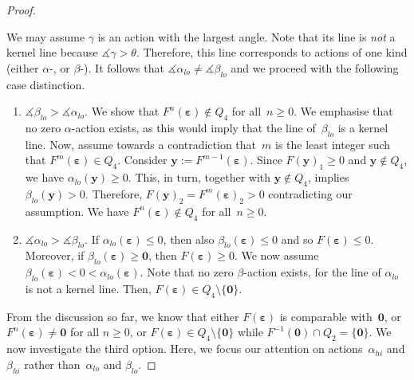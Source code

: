 \documentclass[preprint,12pt]{elsarticle}
\theoremstyle{plain}
\theoremstyle{definition}
\theoremstyle{remark}
\theoremstyle{claimstyle}
\newcommand{\eps}{\bm{\varepsilon}}
\begin{document}
\begin{proof}
\begin{enumerate}
			We may assume $\gamma$ is an action with the largest angle. 
			Note that its line is \emph{not} a kernel line because $\measuredangle\gamma > \theta$.
			Therefore, this line corresponds to actions of one kind (either $\alpha$-, or $\beta$-). 
			It follows that $\measuredangle\alpha_{lo} \neq \measuredangle\beta_{lo}$ and we proceed with the following case distinction.
			\begin{enumerate}
				\item $\measuredangle \beta_{lo} > \measuredangle \alpha_{lo}$. 
				We show that $F^n(\eps) \not\in Q_4$ for all~$n \geq 0$. 
				We emphasise that no zero $\alpha$-action exists, as this would imply that the line of~$\beta_{lo}$ is a kernel line.
				Now, assume towards a contradiction that~$m$ is the least integer such that $F^m(\eps) \in Q_4$.
				Consider $\bm{y}:= F^{m-1}(\eps)$.
				Since $F(\bm{y})_1 \geq 0$ and $\bm{y} \not\in Q_4$, we have $\alpha_{lo}(\bm{y}) \geq 0$.
				This, in turn, together with $\bm{y} \not\in Q_4$, implies $\beta_{lo}(\bm{y}) > 0$. Therefore, $F(\bm{y})_2 = F^m(\eps)_2 > 0$ contradicting our assumption.
				We have $F^n(\eps) \not\in Q_4$ for all~$n \geq 0$.
				
				\item $\measuredangle \alpha_{lo} > \measuredangle \beta_{lo}$.
				If $\alpha_{lo}(\eps) \leq 0$, then also $\beta_{lo}(\eps) \leq 0$ and so $F(\eps) \leq 0$.
				Moreover, if $\beta_{lo}(\eps) \geq \bm{0}$, then $F(\eps) \geq 0$.
				We now assume $\beta_{lo}(\eps) < 0 < \alpha_{lo}(\eps)$.
				Note that no zero $\beta$-action exists, for the line of $\alpha_{lo}$ is not a kernel line.  %
				Then, $F(\eps) \in Q_4 \setminus \{\bm{0}\}$.
			\end{enumerate}
		\end{enumerate}
		
		From the discussion so far, we know that either $F(\eps)$ is comparable with~$\bm{0}$, 
		or $F^n(\eps) \neq \bm{0}$ for all $n \geq 0$,
		or $F(\eps) \in Q_4\setminus \{\bm{0}\}$ while $F^{-1}(\bm{0}) \cap Q_2 = \{\bm{0}\}$.
		We now investigate the third option.
		Here, we focus our attention on actions~$\alpha_{hi}$ and $\beta_{hi}$ rather than~$\alpha_{lo}$ and $\beta_{lo}$.
		

\end{proof}
\end{document}
